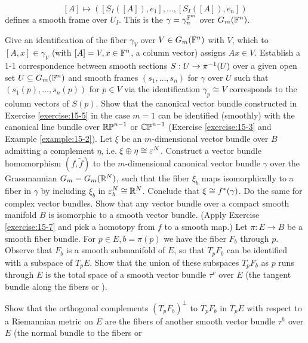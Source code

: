 \begin{enumerate}[label=\theexercise.\arabic*.,ref=\theexercise.\arabic*,leftmargin=2.7em]
    \[
      [  A]   \mapsto  ( {[  {{S}_{I}( [  A]  ),{e}_{1}}] ,\ldots,[  {{S}_{I}( [  A]  ),{e}_{n}}]  })
    \]
    defines a smooth frame over ${U}_{I}$. This is the  $\gamma  = {\gamma }_{n}^{{\mathbb{F}}^{m}}$ over ${G}_{m}( {\mathbb{F}}^{n})$.\par
    Give an identification of the fiber ${\gamma }_{V}$ over $V \in  {G}_{m}( {\mathbb{F}}^{n})$ with $V$, which to $[  {A,x}]   \in  {\gamma }_{V}$ (with $[  A]   = V,x \in  {\ensuremath{\mathbb{F}}}^{n}$, a column vector) assigns ${Ax} \in  V$.
    Establish a 1-1 correspondence between smooth sections $S : U \rightarrow  {\pi }^{-1}( U)$ over a given open set $U \subseteq  {G}_{m}( {\mathbb{F}}^{n})$ and smooth frames $( {{s}_{1},\ldots,{s}_{n}})$ for $\gamma$ over $U$ such that $( {{s}_{1}( p),\ldots,{s}_{n}( p) })$ for $p \in  V$ via the identification ${\gamma }_{p} \cong  V$ corresponds to the column vectors of $S( p)$.
  \NewItem Show that the canonical vector bundle constructed in Exercise \ref{exercise:15-5} in the case $m = 1$ can be identified (smoothly) with the canonical line bundle over ${\mathbb{{RP}}}^{n- 1}$ or ${\mathbb{{CP}}}^{n- 1}$ (Exercise \ref{exercise:15-3} and Example \ref{example:15-2}).
  \NewItem Let $\xi$ be an $m$-dimensional vector bundle over $B$ admitting a complement
    $\eta$, i.e. $\xi\oplus\eta\cong\varepsilon^N$. Construct a vector bundle homomorphism $(f, \tilde{f})$
    to the $m$-dimensional canonical vector bundle $\gamma$ over the Grassmannian $G_m = G_m({\mathbb{R}}^N)$, such that
    the fiber $\xi_b$ maps isomorphically to a fiber in $\gamma$ by including $\xi_b$ in $\varepsilon_b^N\cong{\ensuremath{\mathbb{R}}}^N$.
    Conclude that $\xi\cong f^*(\gamma)$. Do the same for complex vector bundles.
  \NewItem Show that any vector bundle over a compact smooth manifold $B$ is
    isomorphic to a smooth vector bundle. (Apply Exercise \ref{exercise:15-7} and pick a homotopy from $f$
    to a smooth map.)
  \NewItem Let $\pi:E\to B$ be a smooth fiber bundle. For $p\in E, b = \pi(p)$ we have
    the fiber $F_b$ through $p$. Observe that $F_b$ is a smooth submanifold of $E$, so
    that $T_pF_b$ can be identified with a subspace of $T_pE$. Show that the union
    of these subspaces $T_pF_b$ as $p$ runs through $E$ is the total space of a smooth
    vector bundle $\tau^v$ over $E$ (the tangent bundle along the fibers or
    ).\par
    Show that the orthogonal complements $(T_pF_b)^\perp$ to $T_pF_b$ in $T_pE$ with
    respect to a Riemannian metric on $E$ are the fibers of another smooth
    vector bundle $\tau^h$ over $E$ (the normal bundle to the fibers or

\end{enumerate}
